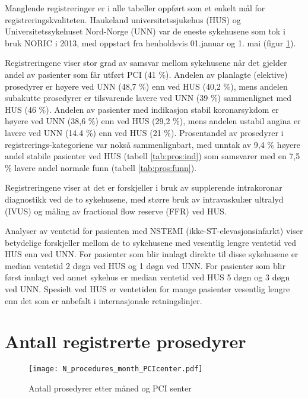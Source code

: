 \documentclass[norsk, a4paper]{report}
\begin{document}
Manglende registreringer er i alle tabeller oppført som et enkelt mål for registreringskvaliteten. Haukeland universitetssjukehus (HUS) og Universitetssykehuset Nord-Norge (UNN) var de eneste sykehusene som tok i bruk NORIC i 2013, med oppstart fra henholdsvis 01.januar og 1. mai (figur \ref{fig:N:SHUS}). 

Registreringene viser stor grad av samsvar mellom sykehusene når det gjelder andel av pasienter som får utført PCI (41 \%). Andelen av planlagte (elektive) prosedyrer er høyere ved UNN (48,7 \%) enn ved HUS (40,2 \%), mens andelen subakutte prosedyrer er tilsvarende lavere ved UNN (39 \%) sammenlignet med HUS (46 \%). Andelen av pasienter med indikasjon stabil koronarsykdom er høyere ved UNN (38,6 \%) enn ved HUS (29,2 \%), mens andelen ustabil angina er lavere ved UNN (14.4 \%) enn ved HUS (21 \%). Prosentandel av prosedyrer i registrerings-kategoriene var nokså sammenlignbart, med unntak av 9,4 \% høyere andel stabile pasienter ved HUS (tabell \ref{tab:pros:ind}) som samsvarer med en 7,5 \% lavere andel normale funn (tabell \ref{tab:pros:funn}).

Registreringene viser at det er forskjeller i bruk av supplerende intrakoronar diagnostikk ved de to sykehusene, med større bruk av intravaskulær ultralyd (IVUS) og måling av fractional flow reserve (FFR) ved HUS. 

Analyser av ventetid for pasienten med NSTEMI (ikke-ST-elevasjonsinfarkt) viser betydelige forskjeller mellom de to sykehusene med vesentlig lengre ventetid ved HUS enn ved UNN. For pasienter som blir innlagt direkte til disse sykehusene er median ventetid 2 døgn ved HUS og 1 døgn ved UNN.  For pasienter som blir først innlagt ved annet sykehus er median ventetid ved HUS 5 døgn og 3 døgn ved UNN. Spesielt ved HUS er ventetiden for mange pasienter vesentlig lengre enn det som er anbefalt i internasjonale retningslinjer.  



\section{Antall registrerte prosedyrer}

\begin{figure}[ht]
  \centering
  \label{fig:N:SHUS}

\texttt{[image: N\_procedures\_month\_PCIcenter.pdf]}\caption{Antall prosedyrer etter måned og PCI senter}
\end{figure}
\end{document}
